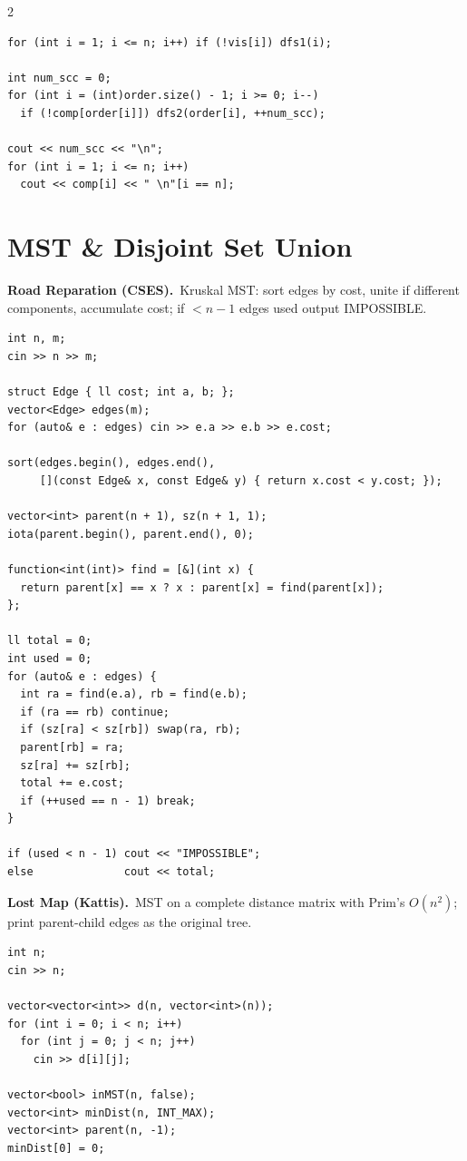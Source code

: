 \documentclass[10pt,letterpaper]{extarticle}
\newcommand{\prob}[2]{\par\addvspace{10pt}\noindent\label{prob:#1}\textbf{\normalsize #1.}\ {\small #2}\par\nopagebreak}
\begin{document}
\begin{multicols*}{2}
\begin{lstlisting}[style=cppt]
for (int i = 1; i <= n; i++) if (!vis[i]) dfs1(i);

int num_scc = 0;
for (int i = (int)order.size() - 1; i >= 0; i--)
  if (!comp[order[i]]) dfs2(order[i], ++num_scc);

cout << num_scc << "\n";
for (int i = 1; i <= n; i++)
  cout << comp[i] << " \n"[i == n];
\end{lstlisting}

\section*{MST \& Disjoint Set Union}

\prob{Road Reparation (CSES)}{Kruskal MST: sort edges by cost, unite if different components, accumulate cost; if $<n-1$ edges used output IMPOSSIBLE.}
\begin{lstlisting}[style=cppt]
int n, m;
cin >> n >> m;

struct Edge { ll cost; int a, b; };
vector<Edge> edges(m);
for (auto& e : edges) cin >> e.a >> e.b >> e.cost;

sort(edges.begin(), edges.end(),
     [](const Edge& x, const Edge& y) { return x.cost < y.cost; });

vector<int> parent(n + 1), sz(n + 1, 1);
iota(parent.begin(), parent.end(), 0);

function<int(int)> find = [&](int x) {
  return parent[x] == x ? x : parent[x] = find(parent[x]);
};

ll total = 0;
int used = 0;
for (auto& e : edges) {
  int ra = find(e.a), rb = find(e.b);
  if (ra == rb) continue;
  if (sz[ra] < sz[rb]) swap(ra, rb);
  parent[rb] = ra;
  sz[ra] += sz[rb];
  total += e.cost;
  if (++used == n - 1) break;
}

if (used < n - 1) cout << "IMPOSSIBLE";
else              cout << total;
\end{lstlisting}

\prob{Lost Map (Kattis)}{MST on a complete distance matrix with Prim's $O(n^2)$; print parent-child edges as the original tree.}
\begin{lstlisting}[style=cppt]
int n;
cin >> n;

vector<vector<int>> d(n, vector<int>(n));
for (int i = 0; i < n; i++)
  for (int j = 0; j < n; j++)
    cin >> d[i][j];

vector<bool> inMST(n, false);
vector<int> minDist(n, INT_MAX);
vector<int> parent(n, -1);
minDist[0] = 0;


\end{lstlisting}
\end{multicols*}
\end{document}
